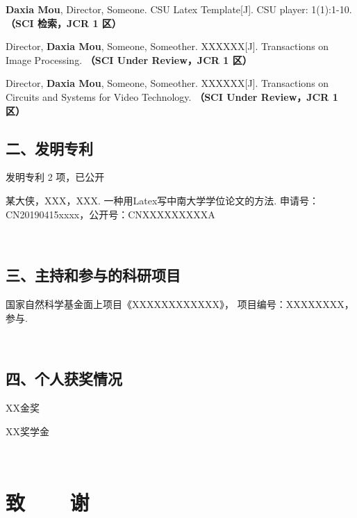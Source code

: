 \else
\begin{enumerate}[label={[\arabic*]},itemindent=2em,wide]
\item \textbf{Daxia Mou}, Director, Someone. CSU Latex Template[J]. CSU player: 1(1):1-10. {\bfseries \heiti（SCI 检索，JCR 1 区）}
\item Director, \textbf{Daxia Mou}, Someone, Someother. XXXXXX[J]. Transactions on Image Processing. {\bfseries \heiti（SCI Under Review，JCR 1 区）}
\item Director, \textbf{Daxia Mou}, Someone, Someother. XXXXXX[J]. Transactions on Circuits and Systems for Video Technology. {\bfseries \heiti（SCI Under Review，JCR 1 区）}
\end{enumerate}
\fi
\vspace{20pt}
\subsection*{二、发明专利}
\ifblindreview
发明专利 2 项，已公开
\else
\begin{enumerate}[label={[\arabic*]},itemindent=2em,wide]
\item 某大侠，XXX，XXX. 一种用Latex写中南大学学位论文的方法. 申请号：CN20190415xxxx，公开号：CNXXXXXXXXXA
\end{enumerate}
\fi

\ifblindreview
\else
{~}
\subsection*{三、主持和参与的科研项目}
\begin{enumerate}[label={[\arabic*]},itemindent=2em,wide]
\item 国家自然科学基金面上项目《XXXXXXXXXXXX》， 项目编号：XXXXXXXX，参与.
\end{enumerate}

{~}
\subsection*{四、个人获奖情况}
\begin{enumerate}[label={[\arabic*]},itemindent=2em,wide]
\item XX金奖
\item XX奖学金
\end{enumerate}
\fi

\newpage

\ifblindreview
\else
{}
{~}
\vspace{-10pt}
\section{致~~~~谢} %
\lipsum
\newpage
\fi